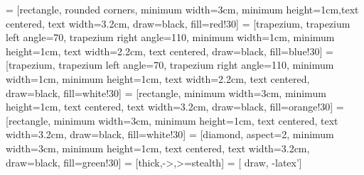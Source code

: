 \usepackage{graphicx}		%
\usepackage[utf8]{inputenc}
\usepackage[T1]{fontenc}

\usepackage{titlepic} %
\usepackage{caption}
\usepackage{subcaption}

\usepackage{amsmath}		
\usepackage{amsfonts}
\usepackage{amssymb}
\usepackage{bm}
\usepackage{appendix}

\usepackage[margin=1in]{geometry}

\usepackage{booktabs}

\usepackage{xcolor}
\usepackage{color}

\usepackage{tikz}
\usetikzlibrary{shapes.geometric, arrows,fit}


\usepackage{hyperref}

\newcommand{\horrule}[1]{\rule{\linewidth}{#1}}
\newcommand{\tab}{\hspace*{3em}}


 = [rectangle, rounded corners, minimum width=3cm, minimum height=1cm,text centered, text width=3.2cm, draw=black, fill=red!30]
 = [trapezium, trapezium left angle=70, trapezium right angle=110, minimum width=1cm, minimum height=1cm, text width=2.2cm, text centered, draw=black, fill=blue!30]
 = [trapezium, trapezium left angle=70, trapezium right angle=110, minimum width=1cm, minimum height=1cm, text width=2.2cm, text centered, draw=black, fill=white!30]
 = [rectangle, minimum width=3cm, minimum height=1cm, text centered, text width=3.2cm, draw=black, fill=orange!30]
 = [rectangle, minimum width=3cm, minimum height=1cm, text centered, text width=3.2cm, draw=black, fill=white!30]
 = [diamond, aspect=2, minimum width=3cm, minimum height=1cm, text centered, text width=3.2cm, draw=black, fill=green!30]
 = [thick,->,>=stealth]
 = [ draw, -latex'] 
